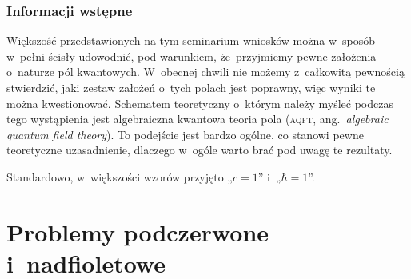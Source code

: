 \documentclass[10pt,t]{beamer}
\begin{document}
\begin{frame}
  \frametitle{Informacji wstępne}


  Większość przedstawionych na tym seminarium wniosków można w~sposób
  w~pełni ścisły udowodnić, \alert{pod warunkiem}, że~przyjmiemy pewne
  założenia o~naturze pól kwantowych. W~obecnej chwili nie możemy
  z~całkowitą pewnością stwierdzić, jaki zestaw założeń
  o~tych polach jest poprawny, więc wyniki te można kwestionować.
  Schematem teoretyczny o~którym należy myśleć podczas tego wystąpienia
  jest algebraiczna kwantowa teoria pola (\textsc{aqft},
  ang.~\textit{algebraic quantum field theory}). To podejście jest bardzo
  ogólne, co stanowi pewne teoretyczne uzasadnienie, dlaczego w~ogóle warto
  brać pod uwagę te rezultaty.


  Standardowo, w~większości wzorów przyjęto „$c = 1$”
  i~„\HorSpaceSeven$\hbar = 1$”.

\end{frame}










\section{Problemy podczerwone i~nadfioletowe}
\end{document}
